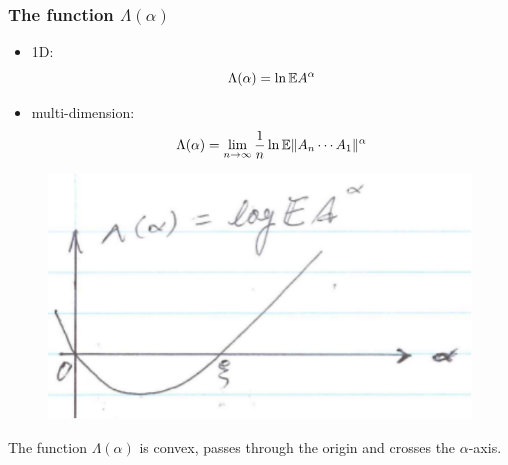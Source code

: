 \documentclass{beamer}
\begin{document}
\begin{frame}
  \frametitle{The function $\Lambda(\alpha)$}
  \begin{minipage}{0.6\linewidth}
      \begin{itemize}
      \item 1D:
        \[
        \Lambda(\alpha) = \ln \mathbb{E} A^\alpha
        \]
      \item multi-dimension:
        \begin{equation*}
          \Lambda(\alpha) = \lim_{n \to \infty} {1 \over n} \ln \mathbb{E} \|A_n \cdots A_1\|^\alpha
        \end{equation*}
      \end{itemize}
  \end{minipage}\hfill
  \begin{minipage}{0.4\linewidth}
    \begin{figure}
      \centering
      \includegraphics[width=1.0\linewidth]{pic2.pdf}
    \end{figure}
    The function $\Lambda(\alpha)$ is convex, passes through the origin
    and crosses the $\alpha$-axis.
  \end{minipage}
\end{frame}
\end{document}
